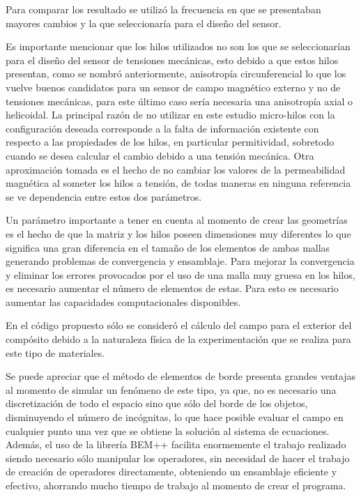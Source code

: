 \documentclass[12pt,letterpaper]{article}
\numberwithin{equation}{section}
\begin{document}
Para comparar los resultado se utilizó la frecuencia en que se presentaban mayores cambios y la que seleccionaría para el diseño del sensor. 

Es importante mencionar que los hilos utilizados no son los que se seleccionarían para el diseño del sensor de tensiones mecánicas, esto debido a que estos hilos presentan, como se nombró anteriormente, anisotropía circunferencial lo que los vuelve buenos candidatos para un sensor de campo magnético externo y no de tensiones mecánicas, para este último caso sería necesaria una anisotropía axial o helicoidal. La principal razón de no utilizar en este estudio micro-hilos con la configuración deseada corresponde a la falta de información existente con respecto a las propiedades de los hilos, en particular permitividad, sobretodo cuando se desea calcular el cambio debido a una tensión mecánica. Otra aproximación tomada es el hecho de no cambiar los valores de la permeabilidad magnética al someter los hilos a tensión, de todas maneras en ninguna referencia se ve dependencia entre estos dos parámetros. 

Un parámetro importante a tener en cuenta al momento de crear las geometrías es el hecho de que la matriz y los hilos poseen dimensiones muy diferentes lo que significa una gran diferencia en el tamaño de los elementos de ambas mallas generando problemas de convergencia y ensamblaje. Para mejorar la convergencia y eliminar los errores provocados por el uso de una malla muy gruesa en los hilos, es necesario aumentar el número de elementos de estas. Para esto es necesario aumentar las capacidades computacionales disponibles.

En el código propuesto sólo se consideró el cálculo del campo para el exterior del compósito debido a la naturaleza física de la experimentación que se realiza para este tipo de materiales.

Se puede apreciar que el método de elementos de borde presenta grandes ventajas al momento de simular un fenómeno de este tipo, ya que, no es necesario una discretización de todo el espacio sino que sólo del borde de los objetos, disminuyendo el número de incógnitas, lo que hace posible evaluar el campo en cualquier punto una vez que se obtiene la solución al sistema de ecuaciones. Además, el uso de la librería BEM++ facilita enormemente el trabajo realizado siendo necesario sólo manipular los operadores, sin necesidad de hacer el trabajo de creación de operadores directamente, obteniendo un ensamblaje eficiente y efectivo, ahorrando mucho tiempo de trabajo al momento de crear el programa.
\end{document}
